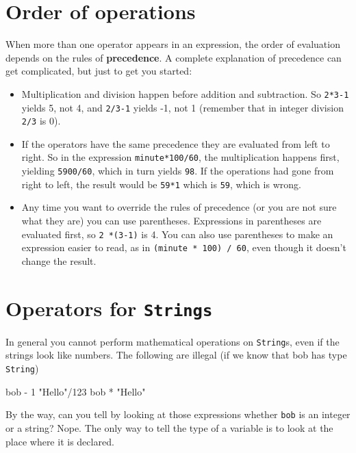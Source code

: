 \section{Order of operations}

When more than one operator appears in an expression, the order
of evaluation depends on the rules of {\bf precedence}.  A
complete explanation of precedence can get complicated, but
just to get you started:

\begin{itemize}

\item Multiplication and division happen before
addition and subtraction.  So {\tt 2*3-1} yields 5, not 4, and
{\tt 2/3-1} yields -1, not 1 (remember that in integer division
{\tt 2/3} is 0).

\item If the operators have the same precedence they are evaluated
from left to right.  So in the expression {\tt minute*100/60},
the multiplication happens first, yielding {\tt 5900/60}, which
in turn yields {\tt 98}.  If the operations had gone from right
to left, the result would be {\tt 59*1} which is {\tt 59}, which
is wrong.

\item Any time you want to override the rules of precedence (or
you are not sure what they are) you can use parentheses.  Expressions
in parentheses are evaluated first, so {\tt 2 *(3-1)} is 4.
You can also use parentheses to make an expression easier to
read, as in {\tt(minute * 100) / 60}, even though it doesn't
change the result.

\end{itemize}


\section{Operators for {\tt Strings}}

In general you cannot perform mathematical operations on {\tt String}s,
even if the strings look like numbers.  The following are
illegal (if we know that bob has type {\tt String})

\begin{stdout}
bob - 1         "Hello"/123      bob * "Hello"
\end{stdout}
%
By the way, can you tell by looking at those expressions
whether {\tt bob} is an integer or a string?  Nope.
The only way to tell the type of a variable is to look at
the place where it is declared.

